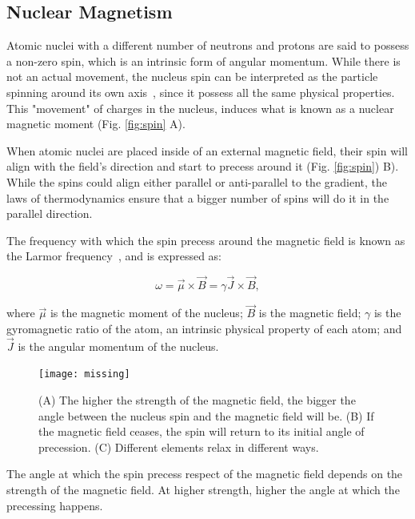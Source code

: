 \subsection{Nuclear Magnetism}
\label{sec:nm}
Atomic nuclei with a different number of neutrons and protons are said to possess
a non-zero spin, which is an intrinsic form of angular momentum. While there is
not an actual movement, the nucleus spin can be interpreted as the particle 
spinning around its own axis~\cite{SEGALA1993}, since it possess all the same
physical properties. This "movement" of charges in the nucleus, induces what is
known as a nuclear magnetic moment (Fig. \ref{fig:spin} A).

When atomic nuclei are placed inside of an external magnetic field, their spin
will align with the field's direction and start to precess around it (Fig. \ref{fig:spin}) B).
While the spins could align either parallel or anti-parallel to the gradient, the
laws of thermodynamics ensure that a bigger number of spins will do it in the 
parallel direction.

The frequency with which the spin precess around the magnetic field is known 
as the Larmor frequency~\cite{Larmor1897}, and is expressed as:

\begin{equation}
    \label{eq:larmor}
    \omega = \vec{\mu} \times \vec{B} = \gamma \vec{J} \times \vec{B},
\end{equation}

where $\vec{\mu}$ is the magnetic moment of the nucleus; $\vec B$ is the
magnetic field; $\gamma$ is the gyromagnetic ratio of the atom, an intrinsic
physical property of each atom; and $\vec{J}$ is the angular momentum of the nucleus.

\begin{figure}[h]
    \texttt{[image: missing]}
    \caption{(A) The higher the strength of the magnetic field, the bigger the angle
             between the nucleus spin and the magnetic field will be. (B) If the
             magnetic field ceases, the spin will return to its initial angle
             of precession. (C) Different elements relax in different ways.}
\label{fig:relaxation}
\end{figure} 

The angle at which the spin precess respect of the magnetic field depends on
the strength of the magnetic field. At higher strength, higher the angle at
which the precessing happens.

